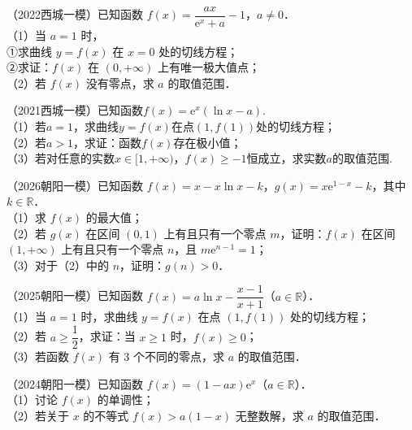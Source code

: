 \begin{example}
（2022西城一模）已知函数 $f(x)=\dfrac{ax}{\mathrm{e}^x+a}-1$，$a\neq0$．\\
（1）当 $a=1$ 时，\\
①求曲线 $y=f(x)$ 在 $x=0$ 处的切线方程；\\
②求证：$f(x)$ 在 $(0,+\infty)$ 上有唯一极大值点；\\
（2）若 $f(x)$ 没有零点，求 $a$ 的取值范围．
\end{example}

\begin{example}
（2021西城一模）已知函数$f(x) = \mathrm{e}^x(\ln x - a)$.\\
（1）若$a = 1$，求曲线$y = f(x)$在点$(1, f(1))$处的切线方程；\\
（2）若$a > 1$，求证：函数$f(x)$存在极小值；\\
（3）若对任意的实数$x \in [1, +\infty)$，$f(x) \geq -1$恒成立，求实数$a$的取值范围.
\end{example}

\begin{example}
（2026朝阳一模）已知函数 $f(x)=x-x\ln x-k$，$g(x)=x\mathrm{e}^{1-x}-k$，其中 $k\in\mathbb{R}$．\\
（1）求 $f(x)$ 的最大值；\\
（2）若 $g(x)$ 在区间 $(0,1)$ 上有且只有一个零点 $m$，证明：$f(x)$ 在区间 $(1,+\infty)$ 上有且只有一个零点 $n$，且 $m\mathrm{e}^{n-1}=1$；\\
（3）对于（2）中的 $n$，证明：$g(n)>0$．
\end{example}

\begin{example}
（2025朝阳一模）已知函数 $f(x)=a\ln x-\dfrac{x-1}{x+1}$（$a\in\mathbb{R}$）．\\
（1）当 $a=1$ 时，求曲线 $y=f(x)$ 在点 $(1,f(1))$ 处的切线方程；\\
（2）若 $a\geqslant\dfrac12$，求证：当 $x\geqslant1$ 时，$f(x)\geqslant0$；\\
（3）若函数 $f(x)$ 有 $3$ 个不同的零点，求 $a$ 的取值范围．
\end{example}

\begin{example}
（2024朝阳一模）已知函数 $f(x)=(1-ax)\mathrm{e}^x$（$a\in\mathbb{R}$）．\\
（1）讨论 $f(x)$ 的单调性；\\
（2）若关于 $x$ 的不等式 $f(x)>a(1-x)$ 无整数解，求 $a$ 的取值范围．
\end{example}

